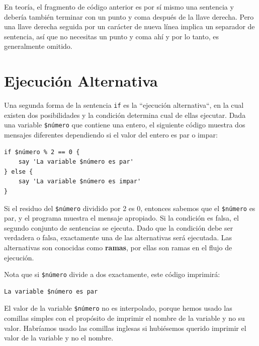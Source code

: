 En teoría, el fragmento de código anterior es por sí mismo una
sentencia y debería también terminar con un punto y coma después
de la llave derecha. Pero una llave derecha seguida por un carácter
de nueva línea implica un separador de sentencia, así que no 
necesitas un punto y coma ahí y por lo tanto, es generalmente
omitido.



\section{Ejecución Alternativa}
\label{alternative.execution}

Una segunda forma de la sentencia {\tt if} es la
``ejecución alternativa``, en la cual existen dos 
posibilidades y la condición determina cual de ellas
ejecutar. Dada una variable \verb|$número| que 
contiene una entero, el siguiente código muestra dos
mensajes diferentes dependiendo si el valor del
entero es par o impar:

\begin{verbatim}
if $número % 2 == 0 {
    say 'La variable $número es par'
} else {
    say 'La variable $número es impar'
}
\end{verbatim}
%
Si el residuo del {\tt \$número} dividido por 2 es 0,
entonces sabemos que el {\tt \$número} es par, y el programa
muestra el mensaje apropiado. Si la condición es falsa,
el segundo conjunto de sentencias se ejecuta. Dado que la
condición debe ser verdadera o falsa, exactamente una de las
alternativas será ejecutada. Las alternativas son conocidas
como {\bf ramas}, por ellas son ramas en el flujo de ejecución.

Nota que si \verb|$número| divide a dos exactamente, este
código imprimirá:

\begin{verbatim} 
La variable $número es par
\end{verbatim}

El valor de la  variable \verb|$número| no es interpolado,
porque hemos usado las comillas simples con el propósito
de imprimir el nombre de la variable y no su valor. Habríamos
usado las comillas inglesas si hubiésemos querido imprimir
el valor de la variable y no el nombre.


